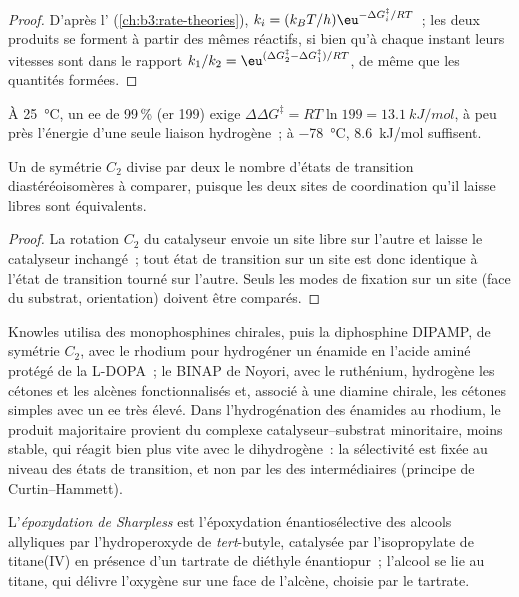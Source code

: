 \begin{proof}
D'après l' (\cref{ch:b3:rate-theories}),
$k_i = (k_BT/h)\eu^{-\Delta G_i^\ddagger/RT}$~; les deux produits se forment à partir des mêmes réactifs, si bien qu'à chaque instant
leurs vitesses sont dans le rapport $k_1/k_2 = \eu^{(\Delta G_2^\ddagger - \Delta G_1^\ddagger)/RT}$, de même que les quantités formées.
\end{proof}

À \qty{25}{\celsius}, un ee de 99\,\% (er 199) exige $\Delta\Delta G^\ddagger = RT\ln 199 = \qty{13.1}{kJ/mol}$, à peu près l'énergie
d'une seule liaison hydrogène~; à \qty{-78}{\celsius}, \qty{8.6}{kJ/mol} suffisent.

\begin{proposition}\label{prop:b3:asymmetric-synthesis:c2}
Un  de symétrie $C_2$ divise par deux le nombre d'états de transition
diastéréoisomères à comparer, puisque les deux sites de coordination qu'il
laisse libres sont équivalents.
\end{proposition}

\begin{proof}
La rotation $C_2$ du catalyseur envoie un site libre sur l'autre et laisse le
catalyseur inchangé~; tout état de transition sur un site est donc
identique à l'état de transition tourné sur l'autre. Seuls les modes de
fixation sur un site (face du substrat, orientation) doivent être
comparés.
\end{proof}

Knowles utilisa des monophosphines chirales, puis la diphosphine DIPAMP, de symétrie $C_2$, avec le rhodium pour
hydrogéner un énamide en l'acide aminé protégé de la L-DOPA~; le BINAP de
Noyori, avec le ruthénium, hydrogène les cétones et les alcènes
fonctionnalisés et, associé à une diamine chirale, les cétones simples avec
un ee très élevé. Dans l'hydrogénation des énamides au rhodium, le produit
majoritaire provient du complexe catalyseur--substrat minoritaire, moins
stable, qui réagit bien plus vite avec le dihydrogène~: la sélectivité est
fixée au niveau des états de transition, et non par les  des
intermédiaires (principe de Curtin--Hammett).

\begin{definition}\label{def:b3:asymmetric-synthesis:sharpless}
L'\emph{époxydation de Sharpless} est
l'époxydation énantiosélective des alcools allyliques par l'hydroperoxyde
de \textit{tert}-butyle, catalysée par l'isopropylate de titane(IV) en présence d'un
tartrate de diéthyle énantiopur~; l'alcool se lie au titane, qui délivre
l'oxygène sur une face de l'alcène, choisie par le tartrate.
\end{definition}

